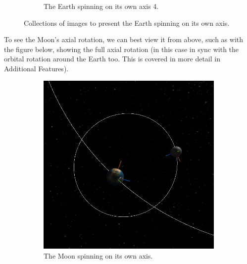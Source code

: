 \documentclass[12pt]{article}
\begin{document}
\begin{figure}[H]
\begin{subfigure}[b]{0.4\textwidth}
                \caption{The Earth spinning on its own axis 4.}
                \label{fig: The axial spin of the Earth 4.}
       \end{subfigure}
       \caption{Collections of images to present the Earth spinning on its own axis.}\label{fig: The Earth's individual rotation.}
\end{figure}

To see the Moon's axial rotation, we can best view it from above, such as with the figure below, showing the full axial rotation (in this case in sync with the orbital rotation around the Earth too. This is covered in more detail in Additional Features).

\begin{figure}[H]
        \centering
        \begin{subfigure}[b]{0.4\textwidth}
                \includegraphics[width=\textwidth]{images/earthandmoonaxisspinabove1}
                \caption{The Moon spinning on its own axis.}
                \label{fig: The axial spin of the Moon.}
       \end{subfigure}
        \begin{subfigure}[b]{0.4\textwidth}

\end{subfigure}
\end{figure}
\end{document}
